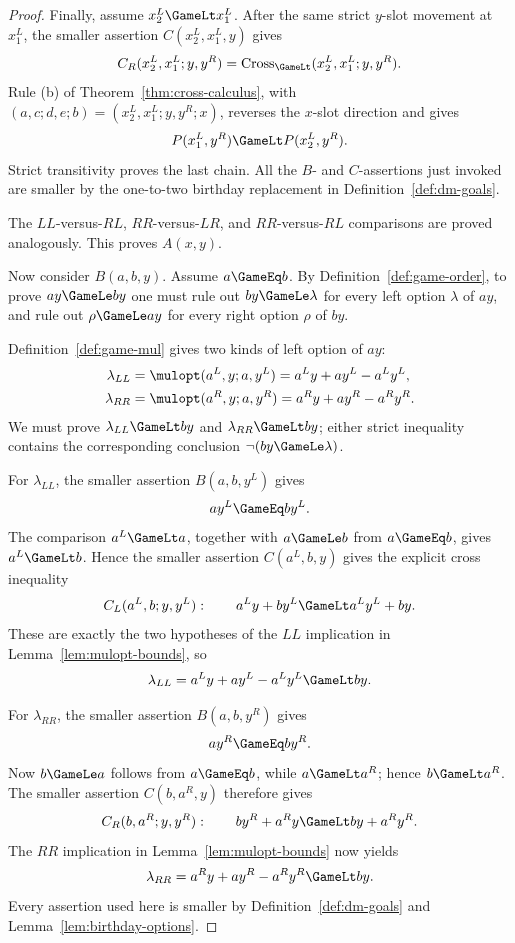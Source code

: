 \begin{proof}
  Finally, assume \(x^L_2\GameLt x^L_1\).  After the same strict
  \(y\)-slot movement at \(x^L_1\), the smaller assertion
  \(C(x^L_2,x^L_1,y)\) gives
  \[
    C_R(x^L_2,x^L_1;y,y^R)
      =\operatorname{Cross}_{\GameLt}(x^L_2,x^L_1;y,y^R).
  \]
  Rule \textup{(b)} of Theorem~\ref{thm:cross-calculus},
  with \((a,c;d,e;b)=(x^L_2,x^L_1;y,y^R;x)\), reverses the \(x\)-slot
  direction and gives
  \[
    P(x^L_1,y^R)\GameLt P(x^L_2,y^R).
  \]
  Strict transitivity proves the last chain.  All the \(B\)- and
  \(C\)-assertions just invoked are smaller by the one-to-two birthday
  replacement in Definition~\ref{def:dm-goals}.

  The \(LL\)-versus-\(RL\), \(RR\)-versus-\(LR\), and
  \(RR\)-versus-\(RL\) comparisons are proved analogously.  This proves
  \(A(x,y)\).

  Now consider \(B(a,b,y)\).  Assume \(a\GameEq b\).  By
  Definition~\ref{def:game-order}, to prove \(ay\GameLe by\) one must rule out
  \(by\GameLe\lambda\) for every left option \(\lambda\) of \(ay\), and rule
  out \(\rho\GameLe ay\) for every right option \(\rho\) of \(by\).

  Definition~\ref{def:game-mul} gives two kinds of left option of \(ay\):
  \[
    \begin{aligned}
      \lambda_{LL}&=\mulopt(a^L,y;a,y^L)
        =a^Ly+ay^L-a^Ly^L,\\
      \lambda_{RR}&=\mulopt(a^R,y;a,y^R)
        =a^Ry+ay^R-a^Ry^R.
    \end{aligned}
  \]
  We must prove \(\lambda_{LL}\GameLt by\) and
  \(\lambda_{RR}\GameLt by\); either strict inequality contains the
  corresponding conclusion \(\neg(by\GameLe\lambda)\).

  For \(\lambda_{LL}\), the smaller assertion \(B(a,b,y^L)\) gives
  \[
    ay^L\GameEq by^L.
  \]
  The comparison \(a^L\GameLt a\), together with \(a\GameLe b\) from
  \(a\GameEq b\), gives \(a^L\GameLt b\).  Hence the smaller assertion
  \(C(a^L,b,y)\) gives the explicit cross inequality
  \[
    C_L(a^L,b;y,y^L):\qquad
    a^Ly+by^L\GameLt a^Ly^L+by.
  \]
  These are exactly the two hypotheses of the \(LL\) implication in
  Lemma~\ref{lem:mulopt-bounds}, so
  \[
    \lambda_{LL}=a^Ly+ay^L-a^Ly^L\GameLt by.
  \]

  For \(\lambda_{RR}\), the smaller assertion \(B(a,b,y^R)\) gives
  \[
    ay^R\GameEq by^R.
  \]
  Now \(b\GameLe a\) follows from \(a\GameEq b\), while
  \(a\GameLt a^R\); hence \(b\GameLt a^R\).  The smaller assertion
  \(C(b,a^R,y)\) therefore gives
  \[
    C_R(b,a^R;y,y^R):\qquad
    by^R+a^Ry\GameLt by+a^Ry^R.
  \]
  The \(RR\) implication in Lemma~\ref{lem:mulopt-bounds} now yields
  \[
    \lambda_{RR}=a^Ry+ay^R-a^Ry^R\GameLt by.
  \]
  Every assertion used here is smaller by Definition~\ref{def:dm-goals} and
  Lemma~\ref{lem:birthday-options}.


\end{proof}
